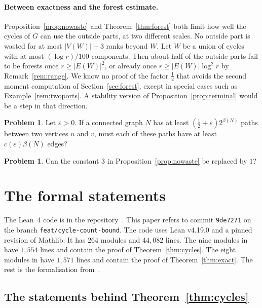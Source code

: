 \documentclass[11pt]{article}
\theoremstyle{definition}
\newtheorem{problem}[theorem]{Problem}
\theoremstyle{remark}
\newcommand{\half}{\tfrac12}
\numberwithin{equation}{section}
\begin{document}
\paragraph{Between exactness and the forest estimate.}
Proposition~\ref{prop:nowaste} and Theorem~\ref{thm:forest} both limit how well the cycles of $G$
can use the outside parts, at two different scales. No outside part is wasted for at most
$|V(W)|+3$ ranks beyond $W$. Let $W$ be a union of cycles with at most $(\log r)/100$ components.
Then about half of the outside parts fail to be forests once $r\ge|E(W)|^{2}$, or already once
$r\ge|E(W)|\log^{2}r$ by Remark~\ref{rem:range}. We know no proof of the factor $\half$ that avoids the second moment
computation of Section~\ref{sec:forest}, except in special cases such as
Example~\ref{rem:twoports}. A stability version of Proposition~\ref{prop:terminal} would be a step
in that direction.

\begin{problem}
Let $\varepsilon>0$. If a connected graph $N$ has at least $(\half+\varepsilon)2^{\beta(N)}$ paths
between two vertices $u$ and $v$, must each of these paths have at least $c(\varepsilon)\beta(N)$
edges?
\end{problem}

\begin{problem}
Can the constant $3$ in Proposition~\ref{prop:nowaste} be replaced by $1$?
\end{problem}

\appendix

\section{The formal statements}\label{app:lean}

The Lean~4 code is in the repository~\cite{Repo}. This paper refers to commit
\texttt{9de7271} on the branch \texttt{feat/cycle-count-bound}. The code uses Lean v4.19.0 and a
pinned revision of Mathlib. It has $264$ modules and $44{,}082$ lines. The nine modules in
 have $1{,}554$ lines and contain the proof of
Theorem~\ref{thm:cycles}. The eight modules in  have $1{,}571$
lines and contain the proof of Theorem~\ref{thm:exact}. The rest is the formalisation
from~\cite{KNT}.

\subsection{The statements behind Theorem~\ref{thm:cycles}}
\end{document}
